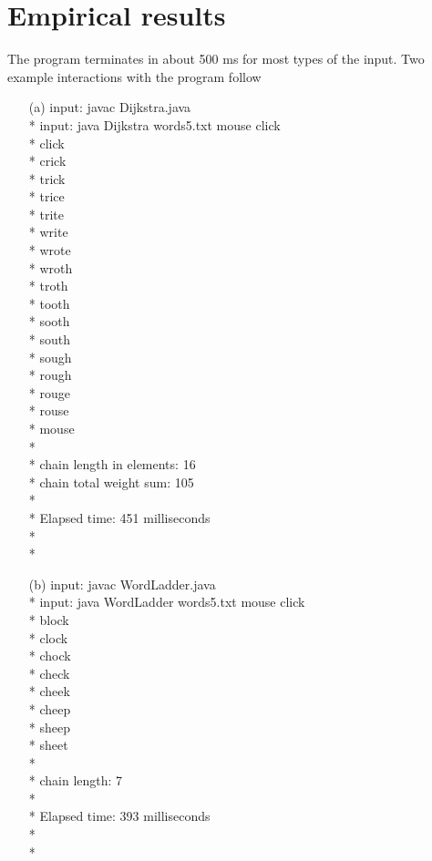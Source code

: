 \documentclass{article}
\begin{document}
\section*{Empirical results}

The program terminates in about 500 ms for most types of the input. Two example interactions with the program follow

\begin{itemize}
\item[(a)] 
input: javac Dijkstra.java\\*
input: java Dijkstra words5.txt mouse click\\*
click\\*
crick\\*
trick\\*
trice\\*
trite\\*
write\\*
wrote\\*
wroth\\*
troth\\*
tooth\\*
sooth\\*
south\\*
sough\\*
rough\\*
rouge\\*
rouse\\*
mouse\\*
\\*
chain length in elements: 16\\*
chain total weight sum: 105\\*
\\*
Elapsed time: 451 milliseconds\\*
\\*
\item[(b)]
input: javac WordLadder.java \\*
input: java WordLadder words5.txt mouse click \\*
block\\*
clock\\*
chock\\*
check\\*
cheek\\*
cheep\\*
sheep\\*
sheet\\*
\\*
chain length: 7\\*
\\*
Elapsed time: 393 milliseconds\\*
\\*
\end{itemize} 
\end{document}
